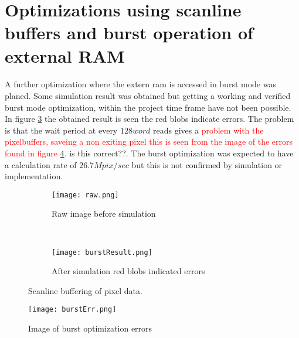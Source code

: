 \section{Optimizations using scanline buffers and burst operation of external RAM}
\paragraph*{}
A further optimization where the extern ram is accessed in burst mode was planed. Some simulation result was obtained but getting a working and verified burst mode optimization, within the project time frame have not been possible. In figure \ref{fig:burst_picture} the obtained result is seen the red blobs indicate errors. The problem is that the wait period at every $128word$ reads gives a \textcolor{red}{problem with the pixelbuffers, saveing a non exiting pixel this is seen from the image of the errors found in figure \ref{fig:pic_burst_err}.} is this correct??. The burst optimization was expected to have a calculation rate of $26.7Mpix/sec$ but this is not confirmed by simulation or implementation.
     
\begin{figure}[H]
	\centering
	\begin{subfigure}[b]{0.5\textwidth}
		\texttt{[image: raw.png]}
		\caption{Raw image before simulation}
		\label{fig:raw_burst}
    \end{subfigure}%
        ~ %
    \begin{subfigure}[b]{0.5\textwidth}
    	\texttt{[image: burstResult.png]}
    	\caption{After simulation red blobs indicated errors}
    	\label{fig:burst_picture_sobel}
	\end{subfigure}
	\caption{Scanline buffering of pixel data.}
    	\label{fig:burst_picture}
\end{figure}


\begin{figure}[H]
	\centering
	\texttt{[image: burstErr.png]}
	\caption{Image of burst optimization errors}
	\label{fig:pic_burst_err}
\end{figure}